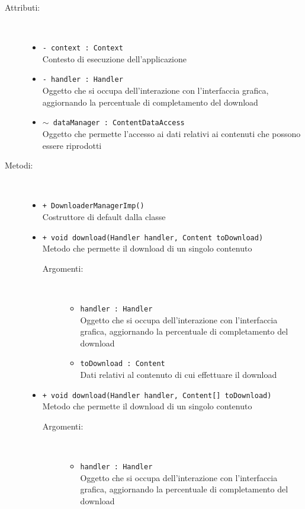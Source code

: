 \documentclass[../Tesi.tex]{subfiles}
\begin{document}
		\begin{description}
			\item[Attributi:] \
			\begin{itemize}
				\item \texttt{- context : Context}\\
				Contesto di esecuzione dell'applicazione

				\item \texttt{- handler : Handler}\\
				Oggetto che si occupa dell'interazione con l'interfaccia grafica, aggiornando la percentuale di completamento del download

				\item \texttt{$\sim$ dataManager : ContentDataAccess}\\
				Oggetto che permette l'accesso ai dati relativi ai contenuti che possono essere riprodotti
			\end{itemize}

			\item[Metodi:] \
			\begin{itemize}
				\item \texttt{+ DownloaderManagerImp()}\\
				Costruttore di default dalla classe 

				\item \texttt{+ void download(Handler handler, Content toDownload)}\\
				Metodo che permette il download di un singolo contenuto
				\begin{description}
					\item[Argomenti:] \
					\begin{itemize}
						\item \texttt{handler : Handler}\\
						Oggetto che si occupa dell'interazione con l'interfaccia grafica, aggiornando la percentuale di completamento del download

						\item \texttt{toDownload : Content}\\
						Dati relativi al contenuto di cui effettuare il download						
					\end{itemize}
				\end{description}

				\item \texttt{+ void download(Handler handler, Content[] toDownload)}\\
				Metodo che permette il download di un singolo contenuto
				\begin{description}
					\item[Argomenti:] \
					\begin{itemize}
						\item \texttt{handler : Handler}\\
						Oggetto che si occupa dell'interazione con l'interfaccia grafica, aggiornando la percentuale di completamento del download


\end{itemize}
\end{description}
\end{itemize}
\end{description}
\end{document}
